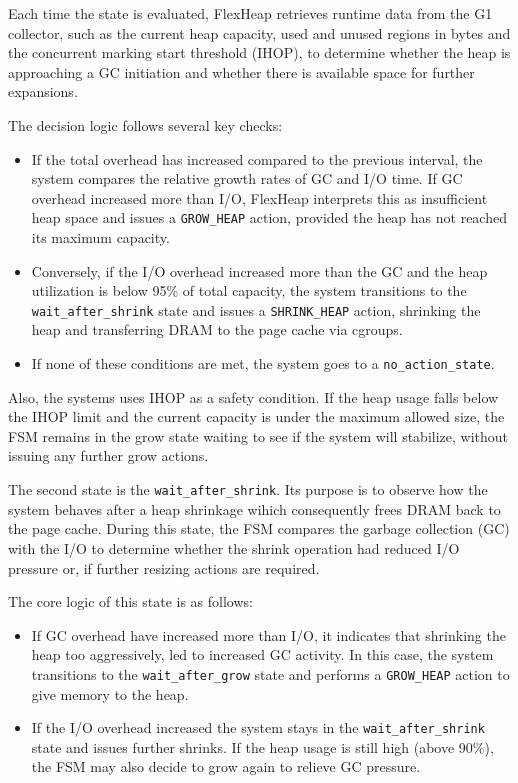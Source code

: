 Each time the state is evaluated, FlexHeap retrieves runtime data from the G1 collector, 
such as the current heap capacity, used and unused regions in bytes and the concurrent marking 
start threshold (IHOP), to determine whether the heap is approaching 
a GC initiation and whether there is available space for further expansions.

The decision logic follows several key checks:
\begin{itemize}
  \item If the total overhead has increased compared to the previous interval, the system
    compares the relative growth rates of GC and I/O time. If GC overhead increased more than I/O, 
    FlexHeap interprets this as insufficient heap space and issues a \texttt{GROW\_HEAP} action, 
    provided the heap has not reached its maximum capacity. 
  \item Conversely, if the I/O overhead increased more than the GC and the heap utilization is below 95\% of
    total capacity, the system transitions to the \texttt{wait\_after\_shrink} state and issues a 
    \texttt{SHRINK\_HEAP} action, shrinking the heap and transferring DRAM to the page cache via cgroups.
  \item If none of these conditions are met, the system goes to a \texttt{no\_action\_state}.
\end{itemize}

Also, the systems uses IHOP as a safety condition. If the heap usage falls below the 
IHOP limit and the current capacity is under the maximum allowed size, the FSM remains in the 
grow state waiting to see if the system will stabilize, without issuing any further grow actions.

The second state is the \texttt{wait\_after\_shrink}. Its purpose is to 
observe how the system behaves after a heap shrinkage wihich consequently frees DRAM back to the page cache. During this
state, the FSM compares the garbage collection (GC) with the I/O to determine whether
the shrink operation had reduced I/O pressure or, if further resizing actions are required.

The core logic of this state is as follows:
\begin{itemize}
  
  \item 
  If GC overhead have increased more than I/O, it indicates that shrinking the heap too aggressively,
  led to increased GC activity. In this case, the system transitions to the \texttt{wait\_after\_grow} state
  and performs a \texttt{GROW\_HEAP} action to give memory to the heap.
  
  \item If the I/O overhead increased the system stays in the \texttt{wait\_after\_shrink} state and issues further shrinks.
  If the heap usage is still high (above 90\%), the FSM may also decide to grow again to relieve GC pressure.
\end{itemize}

